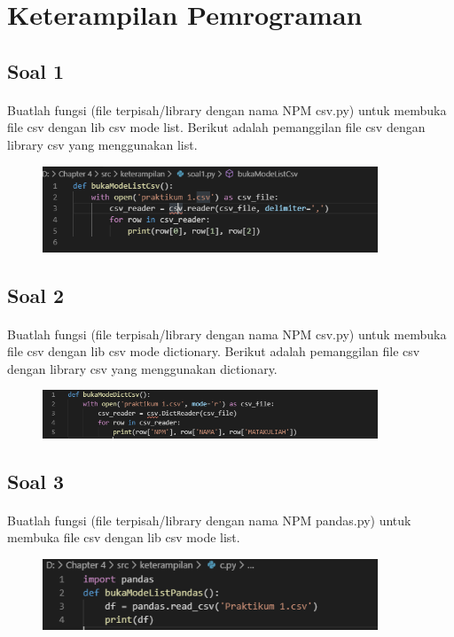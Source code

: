 \documentclass{article}
\begin{document}
\section{Keterampilan Pemrograman}
    \subsection*{Soal 1}
        \paragraph{}Buatlah fungsi (file terpisah/library dengan nama NPM csv.py) untuk membuka file csv dengan lib csv mode list. Berikut adalah pemanggilan file csv dengan library csv yang menggunakan list.
        \begin{figure}[ht]
                \centerline{\includegraphics[width=10cm]{figure/a.PNG}}
            \end{figure}
        
    \subsection*{Soal 2}
        \paragraph{}Buatlah fungsi (file terpisah/library dengan nama NPM csv.py) untuk membuka file csv dengan lib csv mode dictionary. Berikut adalah pemanggilan file csv dengan library csv yang menggunakan dictionary.
        \begin{figure}[ht]
                \centerline{\includegraphics[width=10cm]{figure/b.PNG}}
            \end{figure}
        
    \subsection*{Soal 3}
        \paragraph{}Buatlah fungsi (file terpisah/library dengan nama NPM pandas.py) untuk membuka file csv dengan lib csv mode list.
         \begin{figure}[ht]
                \centerline{\includegraphics[width=10cm]{figure/c.PNG}}
            \end{figure}
  \newpage      
\end{document}

